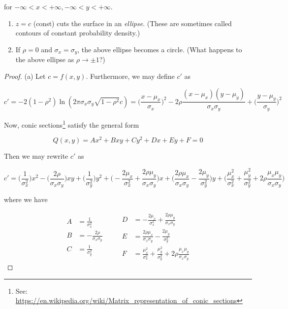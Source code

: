 \documentclass[10pt, oneside]{article}
\begin{document}
\begin{enumerate}[label=9.\arabic*]
\begin{thm}
for $-\infty < x < +\infty, -\infty < y < +\infty$.

\begin{enumerate}
\item $z = c$ (const) cuts the surface in an \textit{ellipse}. (These are sometimes called contours of constant probability density.)
\item If $\rho = 0$ and $\sigma_x = \sigma_y$, the above ellipse becomes a circle. (What happens to the above ellipse as $\rho \rightarrow \pm 1$?)
\end{enumerate}
\end{thm}

\begin{proof}
(a) Let $c = f(x,y)$. Furthermore, we may define $c'$ as

\[ c' = -2(1-\rho^2) \ln (2\pi \sigma_x \sigma_y \sqrt{1-\rho^2} c) = \bigg( \frac{x - \mu_x}{\sigma_x} \bigg)^2 - 2\rho \frac{(x - \mu_x)(y - \mu_y)}{\sigma_x \sigma_y} + \bigg( \frac{y - \mu_y}{\sigma_y} \bigg)^2 \]

Now, conic sections\footnote{See: \url{https://en.wikipedia.org/wiki/Matrix_representation_of_conic_sections}} satisfy the general form

\[ Q(x,y) = Ax^2 + Bxy + Cy^2 + Dx + Ey + F = 0 \]

Then we may rewrite $c'$ as

\[ c' = \bigg( \frac{1}{\sigma^2_x} \bigg) x^2 - \bigg( \frac{2\rho}{\sigma_x \sigma_y} \bigg) xy + \bigg( \frac{1}{\sigma^2_y} \bigg) y^2 + \bigg( -\frac{2\mu_x}{\sigma^2_x} + \frac{2\rho\mu_y}{\sigma_x \sigma_y} \bigg) x + \bigg( \frac{2\rho \mu_x}{\sigma_x \sigma_y} - \frac{2\mu_y}{\sigma^2_y} \bigg) y + \bigg( \frac{\mu^2_x}{\sigma^2_x} + \frac{\mu^2_y}{\sigma^2_y} + 2\rho \frac{\mu_x \mu_y}{\sigma_x \sigma_y} \bigg) \]

where we have

\begin{equation*}
\begin{split}
A &=  \frac{1}{\sigma^2_x} \\
B &= -\frac{2\rho}{\sigma_x \sigma_y} \\
C &= \frac{1}{\sigma^2_y}
\end{split}
\qquad
\begin{split}
D &=  -\frac{2\mu_x}{\sigma^2_x} + \frac{2\rho\mu_y}{\sigma_x \sigma_y} \\
E &=  \frac{2\rho \mu_x}{\sigma_x \sigma_y} - \frac{2\mu_y}{\sigma^2_y} \\
F &=  \frac{\mu^2_x}{\sigma^2_x} + \frac{\mu^2_y}{\sigma^2_y} + 2\rho \frac{\mu_x \mu_y}{\sigma_x \sigma_y}
\end{split}
\end{equation*}


\end{proof}
\end{enumerate}
\end{document}
